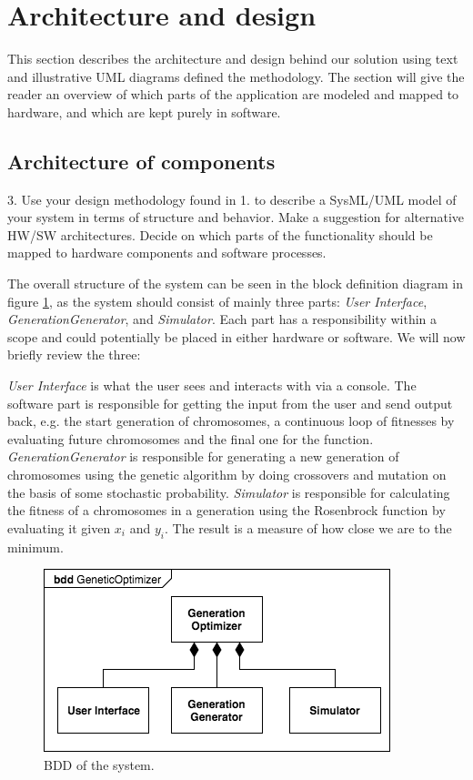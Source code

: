 \section{Architecture and design}\label{sec:archdesign}

This section describes the architecture and design behind our solution using text and illustrative UML diagrams defined the methodology. The section will give the reader an overview of which parts of the application are modeled and mapped to hardware, and which are kept purely in software.

\subsection{Architecture of components}
\begin{framed}
3. Use your design methodology found in 1. to describe a SysML/UML model of your system in terms of structure and behavior. Make a suggestion for alternative HW/SW architectures. Decide on which parts of the functionality should be mapped to hardware components and software processes.
\end{framed}

The overall structure of the system can be seen in the block definition diagram in figure \ref{fig:bdd}, as the system should consist of mainly three parts: \emph{User Interface}, \emph{GenerationGenerator}, and \emph{Simulator}. Each part has a responsibility within a scope and could potentially be placed in either hardware or software. We will now briefly review the three:

\emph{User Interface} is what the user sees and interacts with via a console. The software part is responsible for getting the input from the user and send output back, e.g. the start generation of chromosomes, a continuous loop of fitnesses by evaluating future chromosomes and the final one for the function.
\emph{GenerationGenerator} is responsible for generating a new generation of chromosomes using the genetic algorithm by doing crossovers and mutation on the basis of some stochastic probability.
\emph{Simulator} is responsible for calculating the fitness of a chromosomes in a generation using the Rosenbrock function by evaluating it given $x_{i}$ and $y_{i}$. The result is a measure of how close we are to the minimum.

\begin{figure}[h!]
	\centering
	\includegraphics[width=0.7\linewidth]{../diagrams/bdd.png}
	\caption{BDD of the system.}
	\label{fig:bdd}
\end{figure}

